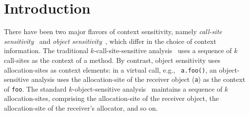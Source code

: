 
\section{Introduction}\label{sec:introduction}

\iffalse
\begin{quote}
  {\it ``Since its introduction, object sensitivity has emerged as the
  dominant flavor of context sensitivity for object-oriented
  languages.''} 
\begin{flushright}
---\cite{Smaragdakis2015}
  \end{flushright}
\end{quote}
\noindent
Context sensitivity is critically important for static program analysis of
object-oriented programs.  A context-sensitive analysis associates
local variables and heap objects with context information of method
calls, computing analysis results separately for different
contexts. This way, context sensitivity prevents analysis information
from being merged along different call chains. For object-oriented and
higher-order languages, it is well-known that context sensitivity is
the primary means for increasing analysis precision without blowing up
analysis cost~\cite{Smaragdakis2015,Thiessen2017,Lhotak2006,
  KastrinisS13a, Smaragdakis2014, Li2018a, JeJeChOh17, %
  Sridharan2006}.
\fi

There have been two major flavors of context sensitivity, namely {\em
  call-site sensitivity}~\cite{Sharir1981,Shivers1988} and {\em object
  sensitivity}~\cite{Milanova2002,Milanova2005}, which differ in the
choice of context information. The traditional $k$-call-site-sensitive
analysis~\cite{Sharir1981} uses a sequence of $k$ call-sites as the
context of a method. By contrast, object sensitivity uses
allocation-sites as context elements: in a virtual call, e.g., {\tt
  a.foo()}, an object-sensitive analysis uses the allocation-site of
the receiver object ({\tt a}) as the context of {\tt foo}. The standard
$k$-object-sensitive
analysis~\cite{Milanova2002,Milanova2005,Smaragdakis2011} maintains a
sequence of $k$ allocation-sites, comprising the allocation-site of
the receiver object, the allocation-site of the receiver's allocator,
and so on.


